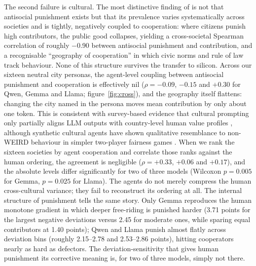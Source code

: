 \documentclass[openacc]{rsproca_new}
\begin{document}
The second failure is cultural. The most distinctive finding of \textcite{herrmann2008antisocial} is not that antisocial punishment exists but that its prevalence varies systematically across societies and is tightly, negatively coupled to cooperation: where citizens punish high contributors, the public good collapses, yielding a cross-societal Spearman correlation of roughly $-$0.90 between antisocial punishment and contribution, and a recognisable ``geography of cooperation'' in which civic norms and rule of law track behaviour. None of this structure survives the transfer to silicon. Across our sixteen neutral city personas, the agent-level coupling between antisocial punishment and cooperation is effectively nil ($\rho = -0.09$, $-0.15$ and $+0.30$ for Qwen, Gemma and Llama; figure~\ref{fig:cross}), and the geography itself flattens: changing the city named in the persona moves mean contribution by only about one token. This is consistent with survey-based evidence that cultural prompting only partially aligns LLM outputs with country-level human value profiles \cite{tao2024cultural}, although synthetic cultural agents have shown qualitative resemblance to non-WEIRD behaviour in simpler two-player fairness games \cite{gonzalezbonorino2025nonweird}. When we rank the sixteen societies by agent cooperation and correlate those ranks against the human ordering, the agreement is negligible ($\rho = +0.33$, $+0.06$ and $+0.17$), and the absolute levels differ significantly for two of three models (Wilcoxon $p=0.005$ for Gemma, $p=0.025$ for Llama). The agents do not merely compress the human cross-cultural variance; they fail to reconstruct its ordering at all. The internal structure of punishment tells the same story. Only Gemma reproduces the human monotone gradient in which deeper free-riding is punished harder (3.71 points for the largest negative deviations versus 2.45 for moderate ones, while sparing equal contributors at 1.40 points); Qwen and Llama punish almost flatly across deviation bins (roughly 2.15--2.78 and 2.53--2.86 points), hitting cooperators nearly as hard as defectors. The deviation-sensitivity that gives human punishment its corrective meaning is, for two of three models, simply not there.
\end{document}
